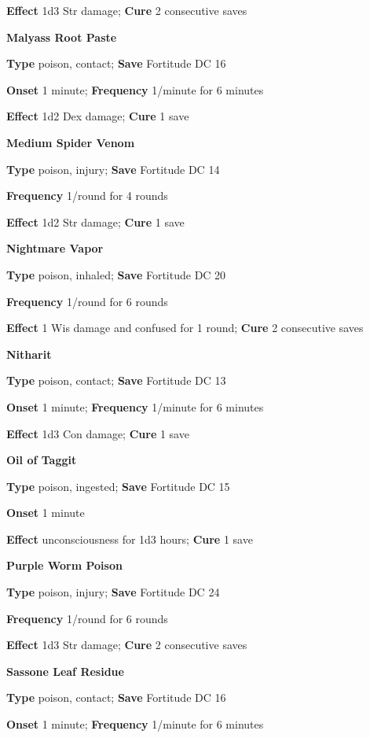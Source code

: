 \textbf{Effect }1d3 Str damage;\textbf{ Cure} 2 consecutive saves
				
\textbf{Malyass Root Paste }
				
\textbf{Type} poison, contact; \textbf{Save} Fortitude DC 16 
				
\textbf{Onset }1 minute; \textbf{Frequency} 1/minute for 6 minutes
				
\textbf{Effect }1d2 Dex damage;\textbf{ Cure} 1 save
				
\textbf{Medium Spider Venom }
				
\textbf{Type} poison, injury; \textbf{Save} Fortitude DC 14 
				
\textbf{Frequency} 1/round for 4 rounds
				
\textbf{Effect }1d2 Str damage;\textbf{ Cure} 1 save
				
\textbf{Nightmare Vapor }
				
\textbf{Type} poison, inhaled; \textbf{Save} Fortitude DC 20 
				
\textbf{Frequency} 1/round for 6 rounds
				
\textbf{Effect }1 Wis damage and confused for 1 round;\textbf{ Cure} 2 consecutive saves
				
\textbf{Nitharit }
				
\textbf{Type} poison, contact; \textbf{Save} Fortitude DC 13 
				
\textbf{Onset }1 minute; \textbf{Frequency} 1/minute for 6 minutes
				
\textbf{Effect }1d3 Con damage;\textbf{ Cure} 1 save
				
\textbf{Oil of Taggit }
				
\textbf{Type} poison, ingested; \textbf{Save} Fortitude DC 15 
				
\textbf{Onset }1 minute
				
\textbf{Effect }unconsciousness for 1d3 hours;\textbf{ Cure} 1 save
				
\textbf{Purple Worm Poison }
				
\textbf{Type} poison, injury; \textbf{Save} Fortitude DC 24 
				
\textbf{Frequency} 1/round for 6 rounds
				
\textbf{Effect }1d3 Str damage;\textbf{ Cure} 2 consecutive saves
				
\textbf{Sassone Leaf Residue }
				
\textbf{Type} poison, contact; \textbf{Save} Fortitude DC 16 
				
\textbf{Onset }1 minute; \textbf{Frequency} 1/minute for 6 minutes
				
